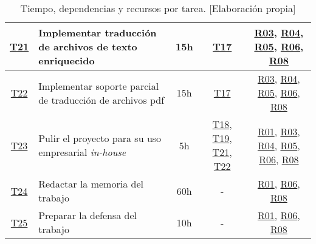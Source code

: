 \begin{landscape}
\begin{table}
\begin{tabular}{ | c | l | c | c | c | }
        \hline
        \hyperref[T21]{T21} & Implementar traducción de archivos de texto enriquecido & 15h & \hyperref[T17]{T17} & \hyperref[R03]{R03}, \hyperref[R04]{R04}, \hyperref[R05]{R05}, \hyperref[R06]{R06}, \hyperref[R08]{R08} \\
        \hline
        \hyperref[T22]{T22} & Implementar soporte parcial de traducción de archivos pdf & 15h & \hyperref[T17]{T17} & \hyperref[R03]{R03}, \hyperref[R04]{R04}, \hyperref[R05]{R05}, \hyperref[R06]{R06}, \hyperref[R08]{R08} \\
        \hline
        \hyperref[T23]{T23} & Pulir el proyecto para su uso empresarial \textit{in-house} & 5h & \hyperref[T18]{T18}, \hyperref[T19]{T19}, \hyperref[T20]{T21}, \hyperref[T22]{T22} & \hyperref[R01]{R01}, \hyperref[R03]{R03}, \hyperref[R04]{R04}, \hyperref[R05]{R05}, \hyperref[R06]{R06}, \hyperref[R08]{R08} \\
        \hline
        \hyperref[T24]{T24} & Redactar la memoria del trabajo & 60h & - & \hyperref[R01]{R01}, \hyperref[R06]{R06}, \hyperref[R08]{R08} \\
        \hline
        \hyperref[T25]{T25} & Preparar la defensa del trabajo & 10h & - & \hyperref[R01]{R01}, \hyperref[R06]{R06}, \hyperref[R08]{R08} \\
        \hline
    \end{tabular}
    \caption{Tiempo, dependencias y recursos por tarea. [Elaboración propia]}
    \end{table}
\end{landscape}
\restoregeometry\clearpage